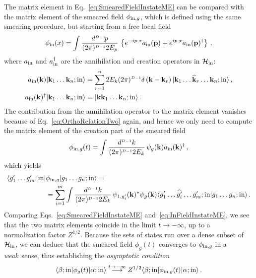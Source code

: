 The matrix element in Eq.~\eqref{eq:SmearedFieldInstateME} can be compared with the
matrix element of the smeared field $\phi_{\mathrm{in},g}$, which is defined using the same 
smearing procedure, but starting from a free local field 
\begin{equation}
    \label{eq:InFieldDefinition}
    \phi_{\mathrm{in}}(x) =
    \int \frac{d^{\scriptscriptstyle{D-1}} \!p}{(2\pi)^{\scriptscriptstyle{D-1}} 2E_p}\,
    \left\{
        e^{-ip\cdot x} a_{\mathrm{in}}(\mathbf{p}) + 
        e^{ip\cdot x} a_{\mathrm{in}}(\mathbf{p})^\dagger
    \right\}\, ,
\end{equation}
where $a_{\mathrm{in}}$ and $a_{\mathrm{in}}^\dagger$ are the annihilation and creation 
operators in $\mathcal{H}_{\mathrm{in}}$:
\begin{align}
    a_{\mathrm{in}}(\mathbf{k}) | \mathbf{k}_1 \ldots \mathbf{k}_n; \mathrm{in} \rangle 
    &= \sum_{r=1}^n 2E_k (2\pi)^{\scriptscriptstyle{D-1}} \delta\left(\mathbf{k}-\mathbf{k}_r\right) 
    | \mathbf{k}_1 \ldots \widehat{\mathbf{k}}_r \ldots \mathbf{k}_n; \mathrm{in} \rangle\, , \\
    a_{\mathrm{in}}(\mathbf{k})^\dagger | \mathbf{k}_1 \ldots \mathbf{k}_n; \mathrm{in} \rangle 
    &= | \mathbf{k} \mathbf{k}_1 \ldots \mathbf{k}_n; \mathrm{in} \rangle \, .
\end{align}
The contribution from the annihilation operator to the matrix element vanishes 
because of Eq.~\eqref{eq:OrthoRelationTwo} again, and hence we only need to compute 
the matrix element of the creation part of the smeared field 
\begin{equation}
    \label{eq:CreationInSmeared}
    \phi_{\mathrm{in},g}(t) = \int \frac{d^{\scriptscriptstyle{D-1}} k}{(2\pi)^{\scriptscriptstyle{D-1}} 2 E_k}\, 
    \psi_{g}(\mathbf{k}) a_{\mathrm{in}}(\mathbf{k})^\dagger\, ,
\end{equation}
which yields 
\begin{align}
    \langle g'_1 \ldots g'_m; \mathrm{in} | &\phi_{\mathrm{in},g} 
    | g_1 \ldots g_n;\mathrm{in} \rangle = \nonumber \\
    \label{eq:InFieldInstateME}
    &=\sum_{i=1}^m \int \frac{d^{\scriptscriptstyle{D-1}} k}{(2\pi)^{\scriptscriptstyle{D-1}} {2 E_k}}\, 
    \psi_{1,g'_i}(\mathbf{k})^* \psi_{g}(\mathbf{k})
    \langle g'_1 \ldots \widehat{g'_i} \ldots g'_m; \mathrm{in} | g_1 \ldots g_n;\mathrm{in} \rangle\, .
\end{align}
Comparing Eqs.~\eqref{eq:SmearedFieldInstateME} and~\eqref{eq:InFieldInstateME}, 
we see that the two matrix elements coincide in the limit $t\to -\infty$, up to a 
normalization factor $Z^{1/2}$. Because the sets of states run over a dense subset of 
$\mathcal{H}_{\mathrm{in}}$, we can deduce that the smeared field $\phi_{g}(t)$ converges to 
$\phi_{\mathrm{in},g}$ in a {\em weak}\ sense, thus establishing the {\em asymptotic condition}
\begin{equation}
    \label{eq:AsymptConnection}
    \langle \beta;\mathrm{in} | \phi_{g}(t) | \alpha;\mathrm{in} \rangle 
    \stackrel{t\to-\infty}{\longrightarrow} 
    Z^{1/2} \langle \beta;\mathrm{in} | \phi_{\mathrm{in},g}(t) | \alpha;\mathrm{in} \rangle \, .
\end{equation}


